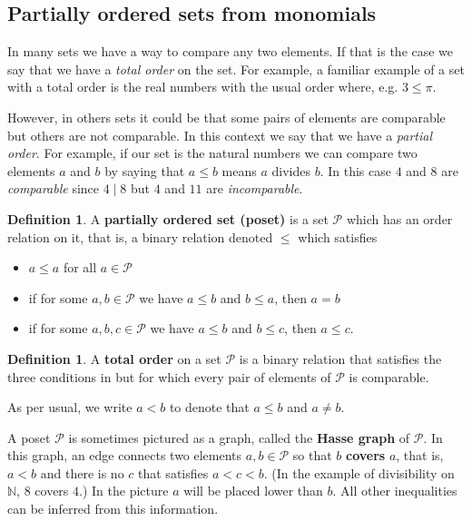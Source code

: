 \documentclass[11pt]{amsart}
\newcommand{\N}{{\mathbb N}}
\renewcommand{\P}{{\mathcal P}}
\theoremstyle{plain} %
\theoremstyle{definition}
\newtheorem{defn}[thm]{Definition}
\theoremstyle{remark}
\numberwithin{equation}{section}  %
\begin{document}
\subsection{Partially ordered sets from monomials}
\phantom{a}

In many sets we have a way to compare any two elements. If that is the case we say that we have a {\em total order} on the set. For example, a familiar example of a set with a total order is the real numbers with the usual order where, e.g. $3 \leq \pi$. 

However, in others sets it could be that some pairs of elements are comparable but others are not comparable. In this context we say that we have a {\em partial order}. For example, if our set is the natural numbers we can compare two elements $a$ and $b$ by saying that $a\leq b$ means $a$ divides $b$. In this case $4$ and $8$ are {\em comparable} since $4\mid 8$ but $4$ and $11$ are {\em incomparable}. 

\begin{tcolorbox}
\begin{defn}\label{def: partial order}
A {\bf partially ordered set (poset)} is a set $\P$ which has an order relation on it, that is, a binary relation denoted $\leq$ which satisfies
\begin{itemize}
\item $a\leq a$ for all $a\in \P$
\item if for some $a,b\in \P$ we have $a\leq b$ and $b\leq a$, then $a=b$
\item if for some $a,b,c \in \P$ we have $a\leq b$ and $b\leq c$, then $a\leq c$.
\end{itemize}
\end{defn}
\end{tcolorbox}

\begin{defn}
A {\bf total order}  on a set $\P$ is a binary relation that satisfies the three conditions in  but for which every pair of elements of $\P$ is comparable.
\end{defn}

As per usual, we write $a<b$ to denote that $a\leq b$ and $a\neq b$.

 A poset $\P$ is sometimes pictured as a graph, called the {\bf Hasse graph} of $\P$. In this graph, an edge connects two elements $a,b\in \P$ so that $b$ {\bf covers} $a$, that is, $a<b$ and there is no $c$ that satisfies $a<c<b$. (In the example of divisibility on $\N$, $8$ covers $4$.)  In the picture $a$ will be placed lower than $b$. All  other inequalities can be inferred from this information.
\end{document}
